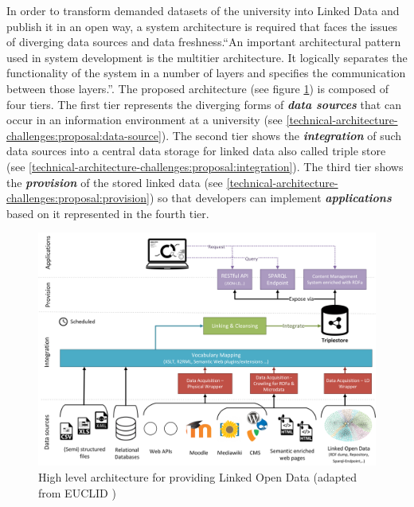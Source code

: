 \documentclass{article}
\begin{document}
In order to transform demanded datasets of the university into Linked Data and publish it in an open way, a system architecture is required that faces the issues of diverging data sources and data freshness.\enquote{An important architectural pattern used in system development is the multitier architecture. It logically separates the functionality of the system in a number of layers and specifies the communication between those layers.}\cite{simperl_using_2013}. The proposed architecture (see figure \ref{fig:tac-high-level-architecture}) is composed of four tiers. The first tier represents the diverging forms of \textbf{\textit{data sources}} that can occur in an information environment at a university (see \ref{technical-architecture-challenges:proposal:data-source}). The second tier shows the \textbf{\textit{integration}} of such data sources into a central data storage for linked data also called triple store (see \ref{technical-architecture-challenges:proposal:integration}). The third tier shows the \textbf{\textit{provision}} of the stored linked data (see \ref{technical-architecture-challenges:proposal:provision}) so that developers can implement \textbf{\textit{applications}} based on it represented in the fourth tier.  

\begin{figure}[t]
\centering \includegraphics*[width=0.9\columnwidth]{images/technical-architecture/lod_technical_architecture.png}
\caption{High level architecture for providing Linked Open Data (adapted from EUCLID {\cite{simperl_using_2013}})}
\label{fig:tac-high-level-architecture}
\end{figure}
\end{document}

